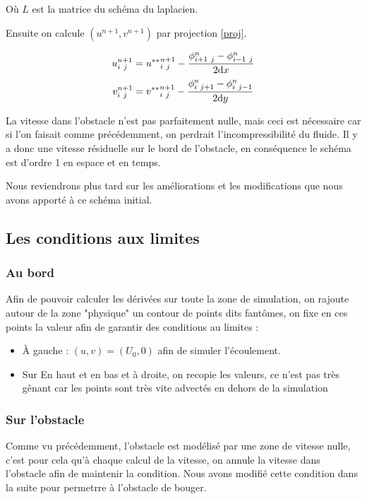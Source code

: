 		Où $L$ est la matrice du schéma du laplacien.
		
		Ensuite on calcule $(u^{n+1},v^{n+1})$ par projection \eqref{proj}.
		
		\begin{equation}
			u^{n+1}_{i \ j}={u^{**}}_{i \ j}^{n+1} - \frac{\phi^n_{i+1 \ j}-\phi^n_{i-1 \ j}}{2\mathrm{d}x}
			\label{proj}
		\end{equation}
		\[	v^{n+1}_{i \ j}={v^{**}}_{i \ j}^{n+1} - \frac{\phi^n_{i \ j+1}-\phi^n_{i \ j-1}}{2\mathrm{d}y} \]

		La vitesse dans l'obstacle n'est pas parfaitement nulle, mais ceci est nécessaire car si l'on faisait comme précédemment, on perdrait l'incompressibilité du fluide. Il y a donc une vitesse résiduelle sur le bord de l'obstacle, en conséquence le schéma est d'ordre 1 en espace et en temps.
		
		Nous reviendrons plus tard sur les améliorations et les modifications que nous avons apporté à ce schéma initial.		
		
	\subsection{Les conditions aux limites}
		
		\subsubsection{Au bord}
			Afin de pouvoir calculer les dérivées sur toute la zone de simulation, on rajoute autour de la zone "physique" un contour de points dits fantômes, on fixe en ces points la valeur afin de garantir des conditions au limites : 
			\begin{itemize}
				\item À gauche : $(u,v) = (U_0,0)$ afin de simuler l'écoulement.
				\item Sur En haut et en bas et à droite, on recopie les valeurs, ce n'est pas très gênant car les points sont très vite advectés en dehors de la simulation
			\end{itemize}
		
		\subsubsection{Sur l'obstacle}

			Comme vu précédemment, l'obstacle est modélisé par une zone de vitesse nulle, c'est pour cela qu'à chaque calcul de la vitesse, on annule la vitesse dans l'obstacle afin de maintenir la condition. Nous avons modifié cette condition dans la suite pour permetrre à l'obstacle de bouger.

